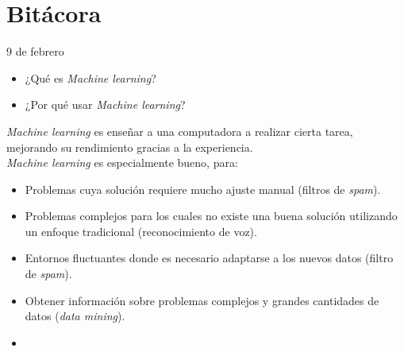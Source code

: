 
\maketitle

\part{Bitácora}
\begin{entry}{9 de febrero}
\tcbsubtitle{\LBlimportant}
\begin{itemize}
    \item ¿Qué es \textit{Machine learning}?
    \item ¿Por qué usar \textit{Machine learning}?
\end{itemize}
\tcblower
\tcbsubtitle{\LBlsummary}
\textit{Machine learning} es enseñar a una computadora a realizar cierta tarea, mejorando su rendimiento gracias a la experiencia.\\

\textit{Machine learning} es especialmente bueno, para:
\begin{itemize}
    \item Problemas cuya solución requiere mucho ajuste manual (filtros de \textit{spam}).
    \item Problemas complejos para los cuales no existe una buena solución utilizando un enfoque tradicional (reconocimiento de voz).
    \item Entornos fluctuantes donde es necesario adaptarse a los nuevos datos (filtro de \textit{spam}).
    \item Obtener información sobre problemas complejos y grandes cantidades de datos (\textit{data mining}).
\end{itemize}
\vspace{0.4em}
\tcbsubtitle{\LBltodo}\vspace{-1.25em}
\begin{itemize}
    \item 
\end{itemize}
\end{entry}
